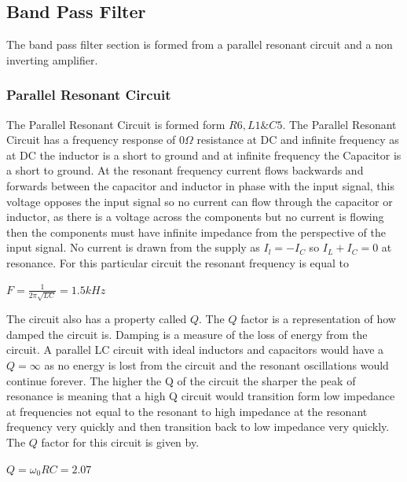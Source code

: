 \documentclass[10pt,a4paper]{article}
\begin{document}
\subsection{Band Pass Filter}   
The band pass filter section is formed from a parallel resonant circuit and a non inverting amplifier.

\subsubsection{Parallel Resonant Circuit}
The Parallel Resonant Circuit is formed form $R6,L1\&C5$. The Parallel Resonant Circuit has a frequency response of $0\Omega$ resistance at DC and infinite frequency as at DC the inductor is a short to ground and at infinite frequency the Capacitor is a short to ground. At the resonant frequency current flows backwards and forwards between the capacitor and inductor in phase with the input signal, this voltage opposes the input signal so no current can flow through the capacitor or inductor, as there is a voltage across the components but no current is flowing then the components must have infinite impedance from the perspective of the input signal. No current is drawn from the supply as $I_l = -I_C$ so $I_L + I_C = 0$ at resonance. For this particular circuit the resonant frequency is equal to

\begin{center}
\Huge

$F=\frac{1}{2\pi\sqrt{LC}} = 1.5kHz$



\end{center}
The circuit also has a property called $Q$. The $Q$ factor is a representation of how damped the circuit is. Damping is a measure of the loss of energy from the circuit. A parallel LC circuit with ideal inductors and capacitors would have a $Q = \infty$ as no energy is lost from the circuit and the resonant oscillations would continue forever. The higher the Q of the circuit the sharper the peak of resonance is meaning that a high Q circuit would transition form low impedance at frequencies not equal to the resonant to high impedance at the resonant frequency very quickly and then transition back to low impedance very quickly. The $Q$ factor for this circuit is given by. 




\begin{center}
\Huge

$Q= \omega_0RC = 2.07$



\end{center}
\end{document}
